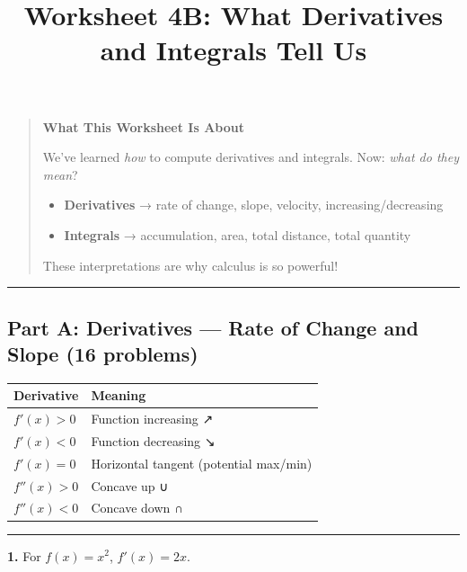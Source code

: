 \documentclass[
  11pt,
]{article}
\title{Worksheet 4B: What Derivatives and Integrals Tell Us}
\author{}
\date{}
\providecommand{\tightlist}{%
  \setlength{\itemsep}{0pt}\setlength{\parskip}{0pt}}
\begin{document}
\maketitle

\begin{quote}
\textbf{What This Worksheet Is About}

We've learned \emph{how} to compute derivatives and integrals. Now:
\emph{what do they mean}?

\begin{itemize}
\tightlist
\item
  \textbf{Derivatives} → rate of change, slope, velocity,
  increasing/decreasing
\item
  \textbf{Integrals} → accumulation, area, total distance, total
  quantity
\end{itemize}

These interpretations are why calculus is so powerful!
\end{quote}

\begin{center}\rule{0.5\linewidth}{0.5pt}\end{center}

\hypertarget{part-a-derivatives-rate-of-change-and-slope-16-problems}{%
\subsection{Part A: Derivatives --- Rate of Change and Slope (16
problems)}\label{part-a-derivatives-rate-of-change-and-slope-16-problems}}

\begin{longtable}[]{@{}ll@{}}
\toprule\noalign{}
Derivative & Meaning \\
\midrule\noalign{}
\endhead
\bottomrule\noalign{}
\endlastfoot
\(f'(x) > 0\) & Function increasing ↗ \\
\(f'(x) < 0\) & Function decreasing ↘ \\
\(f'(x) = 0\) & Horizontal tangent (potential max/min) \\
\(f''(x) > 0\) & Concave up ∪ \\
\(f''(x) < 0\) & Concave down ∩ \\
\end{longtable}

\begin{center}\rule{0.5\linewidth}{0.5pt}\end{center}

\textbf{1.} For \(f(x) = x^2\), \(f'(x) = 2x\).
\end{document}

